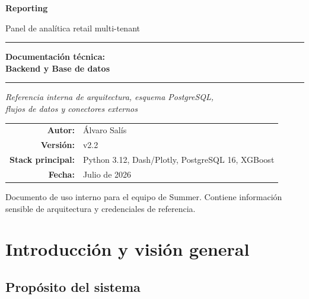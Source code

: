 \documentclass[12pt, a4paper]{article}
\begin{document}
\thispagestyle{empty}
\begin{titlepage}
  \centering
  \vspace*{1.5cm}

  {\Large \textbf{\textcolor{azulUni}{Reporting}}}

  \vspace{0.3cm}
  {\large Panel de analítica retail multi-tenant}

  \vspace{2.5cm}
  \rule{\linewidth}{0.8pt}
  \vspace{0.4cm}

  {\LARGE \textbf{Documentación técnica:\\[0.3em]
  Backend y Base de datos}}

  \vspace{0.4cm}
  \rule{\linewidth}{0.8pt}

  \vspace{1cm}
  {\large \textit{Referencia interna de arquitectura, esquema PostgreSQL,\\
  flujos de datos y conectores externos}}

  \vspace{2.5cm}

  \begin{tabular}{rl}
    \textbf{Autor:}          & Álvaro Salís \\[0.4em]
    \textbf{Versión:}        & v2.2 \\[0.4em]
    \textbf{Stack principal:}          & Python 3.12, Dash/Plotly, PostgreSQL 16, XGBoost \\[0.4em]
    \textbf{Fecha:}          & Julio de 2026 \\
  \end{tabular}

  \vfill
  {\small Documento de uso interno para el equipo de Summer. Contiene información sensible de arquitectura y credenciales de referencia.}
\end{titlepage}

\newpage
\tableofcontents
\newpage

\section{Introducción y visión general}

\subsection{Propósito del sistema}
\end{document}
